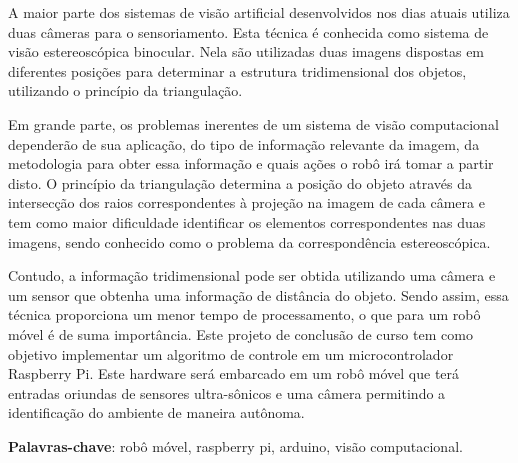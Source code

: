 
\begin{resumo}
A maior parte dos sistemas de visão artificial desenvolvidos nos dias atuais utiliza duas câmeras para o sensoriamento. Esta técnica é conhecida como sistema de visão estereoscópica binocular. Nela são utilizadas duas imagens dispostas em diferentes posições para determinar a estrutura tridimensional dos objetos, utilizando o princípio da triangulação.

Em grande parte, os problemas inerentes de um sistema de visão computacional dependerão de sua aplicação, do tipo de informação relevante da imagem, da metodologia para obter essa informação e quais ações o robô irá tomar a partir disto. O princípio da triangulação determina a posição do objeto através da intersecção dos raios correspondentes à projeção na imagem de cada câmera e tem como maior dificuldade identificar os elementos correspondentes nas duas imagens, sendo conhecido como o problema da correspondência estereoscópica.

Contudo, a informação tridimensional pode ser obtida utilizando uma câmera e um sensor que obtenha uma informação de distância do objeto. Sendo assim, essa técnica proporciona um menor tempo de processamento, o que para um robô móvel é de suma importância. Este projeto de conclusão de curso tem como objetivo implementar um algoritmo de controle em um microcontrolador Raspberry Pi. Este hardware será embarcado em um robô móvel que terá entradas oriundas de sensores ultra-sônicos e uma câmera permitindo a identificação do ambiente de maneira autônoma.

\vspace{\onelineskip}
\noindent
\textbf{Palavras-chave}: robô móvel, raspberry pi, arduino, visão computacional.
\end{resumo}

        


